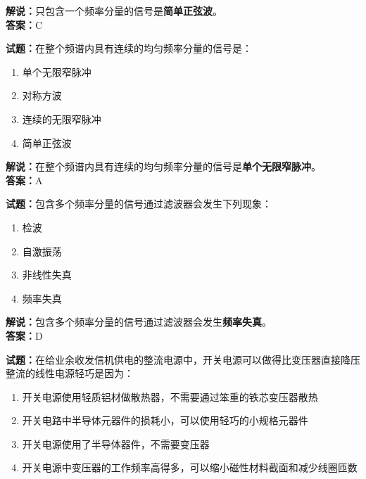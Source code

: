 \documentclass{ctexbook}
\begin{document}
\noindent\textbf{解说：}只包含一个频率分量的信号是\textbf{简单正弦波}。\\\noindent\textbf{答案：}C

\vspace{\baselineskip}

\noindent\textbf{试题：}在整个频谱内具有连续的均匀频率分量的信号是：

\begin{enumerate}[leftmargin=3em]
  \item 单个无限窄脉冲
  \item 对称方波
  \item 连续的无限窄脉冲
  \item 简单正弦波
\end{enumerate}

\noindent\textbf{解说：}在整个频谱内具有连续的均匀频率分量的信号是\textbf{单个无限窄脉冲}。\\\noindent\textbf{答案：}A

\vspace{\baselineskip}

\noindent\textbf{试题：}包含多个频率分量的信号通过滤波器会发生下列现象：

\begin{enumerate}[leftmargin=3em]
  \item 检波
  \item 自激振荡
  \item 非线性失真
  \item 频率失真
\end{enumerate}

\noindent\textbf{解说：}包含多个频率分量的信号通过滤波器会发生\textbf{频率失真}。\\\noindent\textbf{答案：}D

\vspace{\baselineskip}

\noindent\textbf{试题：}在给业余收发信机供电的整流电源中，开关电源可以做得比变压器直接降压整流的线性电源轻巧是因为：

\begin{enumerate}[leftmargin=3em]
  \item 开关电源使用轻质铝材做散热器，不需要通过笨重的铁芯变压器散热
  \item 开关电路中半导体元器件的损耗小，可以使用轻巧的小规格元器件
  \item 开关电源使用了半导体器件，不需要变压器
  \item 开关电源中变压器的工作频率高得多，可以缩小磁性材料截面和减少线圈匝数
\end{enumerate}
\end{document}
